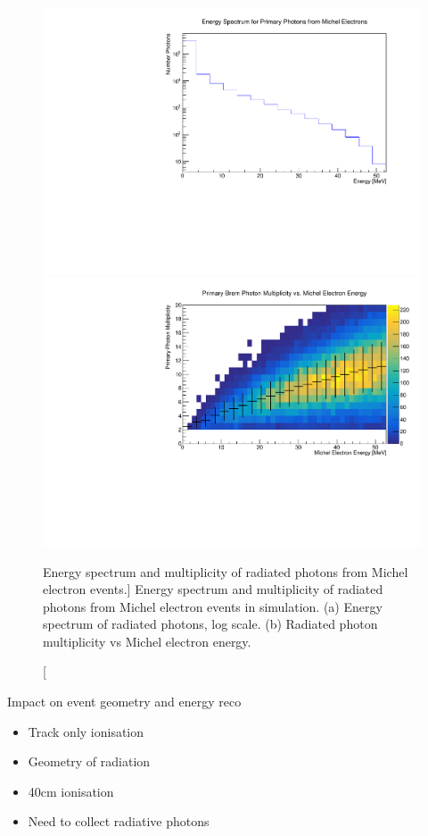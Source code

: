 \begin{figure}
	\centering
	\includegraphics[width=\textwidth]{figures/photon_spec.pdf}
	\newline
	\includegraphics[width=\textwidth]{figures/photon_mult.pdf}
	\caption
	[Energy spectrum and multiplicity of radiated photons from Michel electron 
	events.]
	{Energy spectrum  and multiplicity of radiated photons from Michel electron events in
	\protodune{} simulation. 
	(a) Energy spectrum of radiated photons, log scale. 
	(b) Radiated photon multiplicity vs Michel electron energy. 
	}
	\label{fig:photon_spec}
\end{figure}


\begin{mccorrection}
	Impact on event geometry and energy reco
	\begin{itemize}
	\item Track only ionisation
	\item Geometry of radiation
	\item 40cm ionisation 
	\item Need to collect radiative photons
	\end{itemize}
\end{mccorrection}

